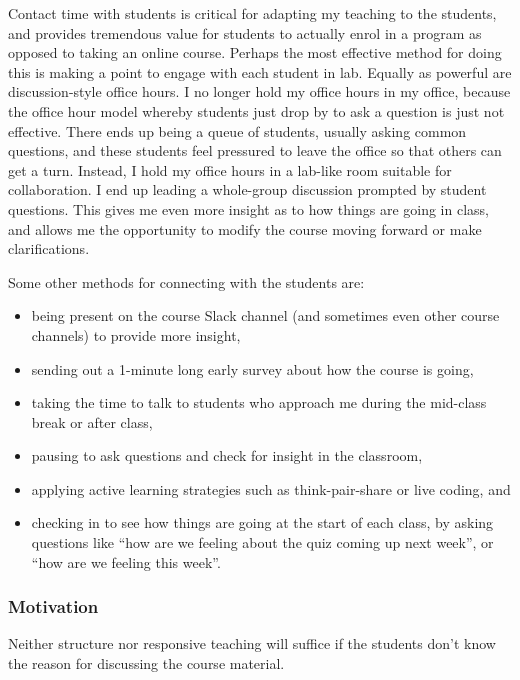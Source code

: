 \documentclass[]{article}
\providecommand{\tightlist}{%
  \setlength{\itemsep}{0pt}\setlength{\parskip}{0pt}}
\begin{document}
Contact time with students is critical for adapting my teaching to the students, and provides tremendous value for students to actually enrol in a program as opposed to taking an online course. Perhaps the most effective method for doing this is making a point to engage with each student in lab. Equally as powerful are discussion-style office hours. I no longer hold my office hours in my office, because the office hour model whereby students just drop by to ask a question is just not effective. There ends up being a queue of students, usually asking common questions, and these students feel pressured to leave the office so that others can get a turn. Instead, I hold my office hours in a lab-like room suitable for collaboration. I end up leading a whole-group discussion prompted by student questions. This gives me even more insight as to how things are going in class, and allows me the opportunity to modify the course moving forward or make clarifications.

Some other methods for connecting with the students are:

\begin{itemize}
\tightlist
\item
  being present on the course Slack channel (and sometimes even other course channels) to provide more insight,
\item
  sending out a 1-minute long early survey about how the course is going,
\item
  taking the time to talk to students who approach me during the mid-class break or after class,
\item
  pausing to ask questions and check for insight in the classroom,
\item
  applying active learning strategies such as think-pair-share or live coding, and
\item
  checking in to see how things are going at the start of each class, by asking questions like ``how are we feeling about the quiz coming up next week'', or ``how are we feeling this week''.
\end{itemize}

\hypertarget{motivation}{%
\subsubsection{Motivation}\label{motivation}}

Neither structure nor responsive teaching will suffice if the students don't know the reason for discussing the course material.
\end{document}
